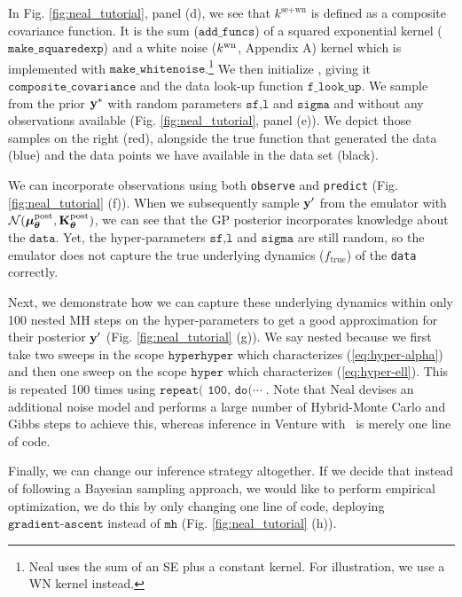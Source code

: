 In Fig. \ref{fig:neal_tutorial}, panel (d), we see that $k^{\text{se}+\text{wn}}$
is defined as a composite covariance function. It is the sum ($\texttt{add\_funcs}$) of
a squared exponential kernel ($\texttt{make\_squaredexp}$) and a white noise
($k^\text{wn}$, Appendix A)
kernel which is implemented with $\texttt{make\_whitenoise}$.\footnote{
Neal \citeyearpar{neal1997monte} uses the sum of an SE
plus a constant kernel. For illustration, we use a WN kernel
instead.}
We then initialize \gpmem, giving it $\texttt{composite\_covariance}$ and the data
look-up function $\texttt{f\_look\_up}$. 
We sample from the prior $\mathbf{y}^*$ with random parameters $\texttt{sf,l}$ and $\texttt{sigma}$ and 
without any observations available (Fig. \ref{fig:neal_tutorial}, panel (e)).
We depict those samples on the right (red), alongside the true function that generated the data (blue) and
the data points we have available in the data set (black).

We can incorporate observations using both \texttt{observe} and \texttt{predict} (Fig. \ref{fig:neal_tutorial} (f)).
When we subsequently sample $\mathbf{y}^\prime$ from the emulator with
$\mathcal{N}(\bm{\mu}_{\bm{\theta}}^\text{post},\mathbf{K}_{\bm{\theta}}^\text{post})$, we can see that the \ac{GP} posterior incorporates knowledge 
about the $\texttt{data}$. Yet, the hyper-parameters $\texttt{sf,l}$ and $\texttt{sigma}$ are still
random, so the emulator does not capture the true underlying dynamics
($f_\text{true}$) of the \texttt{data} correctly. 

Next, we demonstrate how we can capture these underlying dynamics within only
100  nested \ac{MH} steps on the hyper-parameters to get a good approximation
for their posterior $\mathbf{y}^\prime$ (Fig. \ref{fig:neal_tutorial} (g)).
We say nested because we first take two sweeps in the scope
$\texttt{hyperhyper}$ which characterizes (\ref{eq:hyper-alpha}) and then one
sweep on the scope $\texttt{hyper}$ which characterizes (\ref{eq:hyper-ell}).
This is repeated 100 times using $\texttt{repeat( 100, do(}\cdots\;$.
Note that Neal devises an additional noise model and performs a large number of Hybrid-Monte Carlo and Gibbs steps to achieve this, whereas inference in Venture with \gpmem\ is merely one line of code. 

Finally, we can change our inference strategy altogether. If we decide that instead of
following a Bayesian sampling approach, we would like to perform empirical optimization,
we do this by only changing one line of code, deploying $\texttt{gradient-ascent}$ instead
of $\texttt{mh}$ (Fig. \ref{fig:neal_tutorial} (h)). 

